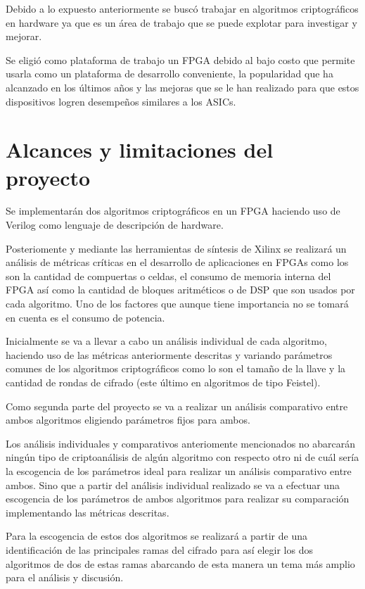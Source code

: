 Debido a lo expuesto anteriormente se buscó trabajar en algoritmos criptográficos en hardware ya que es un área de trabajo que se puede explotar para investigar y mejorar.

Se eligió como plataforma de trabajo un FPGA debido al bajo costo que permite usarla como un plataforma de desarrollo conveniente, la popularidad que ha alcanzado en los últimos años y las mejoras que se le han realizado para que estos dispositivos logren desempeños similares a los ASICs.

\section{Alcances y limitaciones del proyecto}
Se implementarán dos algoritmos criptográficos en un FPGA haciendo uso de Verilog como lenguaje de descripción de hardware. 

Posteriomente y mediante las herramientas de síntesis de Xilinx se realizará un análisis de métricas críticas en el desarrollo de aplicaciones en FPGAs como los son la cantidad de compuertas o celdas, el consumo de memoria interna del FPGA así como la cantidad de bloques aritméticos o de DSP que son usados por cada algoritmo. Uno de los factores que aunque tiene importancia no se tomará en cuenta es el consumo de potencia.

Inicialmente se va a llevar a cabo un análisis individual de cada algoritmo, haciendo uso de las métricas anteriormente descritas y variando parámetros comunes de los algoritmos criptográficos como lo son el tamaño de la llave y la cantidad de rondas de cifrado (este último en algoritmos de tipo Feistel). 

Como segunda parte del proyecto se va a realizar un análisis comparativo entre ambos algoritmos eligiendo parámetros fijos para ambos.

Los análisis individuales y comparativos anteriomente mencionados no abarcarán ningún tipo de criptoanálisis de algún algoritmo con respecto otro ni de cuál sería la escogencia de los parámetros ideal para realizar un análisis comparativo entre ambos. Sino que a partir del análisis individual realizado se va a efectuar una escogencia de los parámetros de ambos algoritmos para realizar su comparación implementando las métricas descritas.

Para la escogencia de estos dos algoritmos se realizará a partir de una identificación de las principales ramas del cifrado para así elegir los dos algoritmos de dos de estas ramas abarcando de esta manera un tema más amplio para el análisis y discusión.

